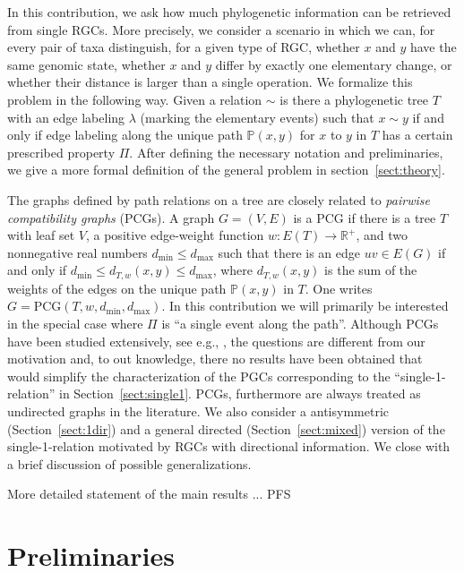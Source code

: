 \documentclass[smallextended]{svjour3}
\newcommand{\rev}[1]{\begingroup\color{blue}#1\endgroup}
\newcommand{\TODO}[1]{\begingroup\color{red}#1\endgroup}
\begin{document}
In this contribution, we ask how much phylogenetic information can be
retrieved from single RGCs. More precisely, we consider a scenario in which
we can, for every pair of taxa distinguish, for a given type of RGC,
whether $x$ and $y$ have the same genomic state, whether $x$ and $y$ differ
by exactly one elementary change, or whether their distance is larger than
a single operation. We formalize this problem in the following way. Given a
relation $\sim$ is there a phylogenetic tree $T$ with an edge labeling
$\lambda$ (marking the elementary events) such that $x\sim y$ if and only
if edge labeling along the unique path $\mathbb{P}(x,y)$ for $x$ to $y$ in
$T$ has a certain prescribed property $\Pi$. After defining the necessary
notation and preliminaries, we give a more formal definition of the general
problem in section~\ref{sect:theory}.

\rev{The graphs defined by path relations on a tree are closely related to
  \emph{pairwise compatibility graphs} (PCGs). A graph $G =(V,E)$ is a PCG
  if there is a tree $T$ with leaf set $V$, a positive edge-weight function
  $w:E(T)\to \mathbb{R}^+$, and two nonnegative real numbers $d_{\min}\le
  d_{\max}$ such that there is an edge $uv \in E(G)$ if and only if
  $d_{\min}\leq d_{T,w}(x,y) \leq d_{\max}$, where $d_{T,w}(x,y)$ is the
  sum of the weights of the edges on the unique path $\mathbb{P}(x,y)$ in
  $T$. One writes $G = \mathrm{PCG}(T, w, d_{\min} , d_{\max})$.} In this
contribution we will primarily be interested in the special case where
$\Pi$ is ``a single event along the path''. \rev{Although PCGs have been
  studied extensively, see e.g.,
  \citet{PCGsurvey,YHTR:08,YBR:10,CMPS:13,MR:13,DMR:13}, the questions are
  different from our motivation and, to out knowledge, there no results
  have been obtained that would simplify the characterization of the PGCs
  corresponding to the ``single-1-relation'' in Section~\ref{sect:single1}.
  PCGs, furthermore are always treated as undirected graphs in the
  literature.  We also consider a antisymmetric (Section~\ref{sect:1dir})
  and a general directed (Section~\ref{sect:mixed}) version of the
  single-1-relation motivated by RGCs with directional information. We
  close with a brief discussion of possible generalizations.}

\TODO{More detailed statement of the main results ... PFS } 


\section{Preliminaries}
\label{sec:prelim}
\end{document}
